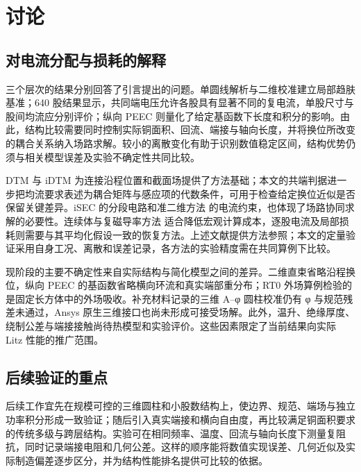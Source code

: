 \section{讨论}
\label{chapter:04}

\hypertarget{04.discussion.heading}{}
\subsection{对电流分配与损耗的解释}

\hypertarget{04.discussion.p1}{}
三个层次的结果分别回答了引言提出的问题。单圆线解析与二维校准建立局部趋肤基准；640 股结果显示，共同端电压允许各股具有显著不同的复电流，单股尺寸与股间均流应分别评价；纵向 PEEC 则量化了给定基函数下长度和积分的影响。由此，结构比较需要同时控制实际铜面积、回流、端接与轴向长度，并将换位所改变的耦合关系纳入场路求解。较小的离散变化有助于识别数值稳定区间，结构优势仍须与相关模型误差及实验不确定性共同比较。

\hypertarget{04.discussion.p2}{}
DTM 与 iDTM \cite{P01,N01} 为连接沿程位置和截面场提供了方法基础；本文的共端判据进一步把均流要求表述为耦合矩阵与感应项的代数条件，可用于检查给定换位近似是否保留关键差异。iSEC \cite{P02} 的分段电路和准二维方法 \cite{P04} 的电流约束，也体现了场路协同求解的必要性。连续体与复磁导率方法 \cite{P05,P09} 适合降低宏观计算成本，逐股电流及局部损耗则需要与其平均化假设一致的恢复方法。上述文献提供方法参照；本文的定量验证采用自身工况、离散和误差记录，各方法的实验精度需在共同算例下比较。

\hypertarget{04.discussion.p3}{}
现阶段的主要不确定性来自实际结构与简化模型之间的差异。二维直束省略沿程换位，纵向 PEEC 的基函数省略横向环流和真实端部重分布；RT0 外场算例检验的是固定长方体中的外场吸收。补充材料记录的三维 A–φ 圆柱校准仍有 φ 与规范残差未通过，Ansys 原生三维接口也尚未形成可接受场解。此外，温升、绝缘厚度、绕制公差与端接接触尚待热模型和实验评价。这些因素限定了当前结果向实际 Litz 性能的推广范围。

\hypertarget{04.recommendations.heading}{}
\subsection{后续验证的重点}

\hypertarget{04.recommendations.p1}{}
后续工作宜先在规模可控的三维圆柱和小股数结构上，使边界、规范、端场与独立功率积分形成一致验证；随后引入真实端接和横向自由度，再比较满足铜面积要求的传统多级与跨层结构。实验可在相同频率、温度、回流与轴向长度下测量复阻抗，同时记录端接电阻和几何公差。这样的顺序能将数值实现误差、几何近似及实际制造偏差逐步区分，并为结构性能排名提供可比较的依据。
